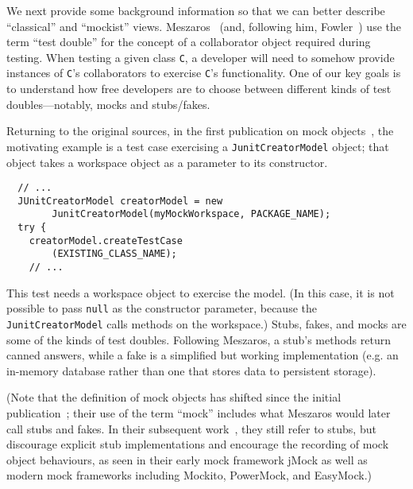 We next provide some background information so that we can better describe ``classical'' and ``mockist'' views.
Meszaros~\cite{meszaros2007xunit} (and, following him, Fowler~\cite{fowler07:_mocks_arent_stubs}) use the term ``test double'' for the concept of a collaborator object required during testing. When testing a given class \texttt{C}, a developer will need to somehow provide instances of \texttt{C}'s collaborators to exercise \texttt{C}'s functionality. 
One of our key goals is to understand how free developers are to choose between different kinds of test doubles---notably, mocks and stubs/fakes. 

Returning to the original sources, in the first publication on mock objects~\cite{mackinnon00:_endo_testin}, the motivating example is a test case exercising a \texttt{JunitCreatorModel} object; that object takes a workspace object as a parameter to its constructor.

\begin{lstlisting}
  // ...
  JUnitCreatorModel creatorModel = new
        JunitCreatorModel(myMockWorkspace, PACKAGE_NAME);
  try {
    creatorModel.createTestCase
        (EXISTING_CLASS_NAME);
    // ...
\end{lstlisting}

This test needs a workspace object to exercise the model. (In this case, it is not possible to pass \texttt{null} as the constructor parameter, because the \texttt{JunitCreatorModel} calls methods on the workspace.) Stubs, fakes, and mocks are some of the kinds of test doubles. Following Meszaros, a stub's methods return canned answers, while a fake is a simplified but working implementation (e.g. an in-memory database rather than one that stores data to persistent storage). 

(Note that the definition of mock objects has shifted since the initial publication~\cite{mackinnon00:_endo_testin}; their use of the term ``mock'' includes what Meszaros would later call stubs and fakes. In their subsequent work~\cite{freeman04:_mock_roles_objec}, they still refer to stubs, but discourage explicit stub implementations and encourage the recording of mock object behaviours, as seen in their early mock framework jMock as well as modern mock frameworks including Mockito, PowerMock, and EasyMock.)

